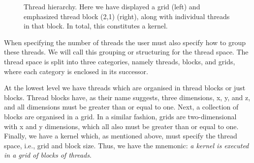 \begin{figure}
\begin{center}
\end{center}
\caption{Thread hierarchy. Here we have displayed a grid
  (left) and emphasized thread block (2,1) (right), along
  with individual threads in that block. In total, this
  constitutes a kernel.}
\label{fig:thread_hierarchy}
\end{figure}
%

When specifying the number of threads the user must also
specify how to group these threads. We will call this
grouping or structuring for the thread space. The thread
space is split into three categories, namely threads,
blocks, and grids, where each category is enclosed in its
successor.

At the lowest level we have threads which are organised in
thread blocks or just blocks. Thread blocks have, as their
name suggests, three dimensions, x, y, and z, and all
dimensions must be greater than or equal to one. Next, a
collection of blocks are organised in a grid.  In a similar
fashion, grids are two-dimensional with x and y dimensions,
which all also must be greater than or equal to one.
Finally, we have a kernel which, as mentioned above, must
specify the thread space, i.e., grid and block size. Thus,
we have the mnemonic: \emph{a kernel is executed in a grid
  of blocks of threads}.

